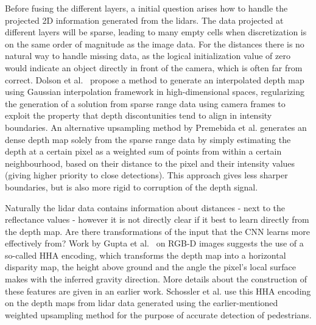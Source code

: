 Before fusing the different layers, a initial question arises how to handle the projected 2D information generated from the lidars. The data projected at different layers will be sparse, leading to many empty cells when discretization is on the same order of magnitude as the image data. For the distances there is no natural way to handle missing data, as the logical initialization value of zero would indicate an object directly in front of the camera, which is often far from correct. Dolson et al.~\cite{dolson2010} propose a method to generate an interpolated depth map using Gaussian interpolation framework in high-dimensional spaces, regularizing the generation of a solution from sparse range data using camera frames to exploit the property that depth discontunities tend to align in intensity boundaries. An alternative upsampling method by Premebida et al.\cite{premebida2014} generates an dense depth map solely from the sparse range data by simply estimating the depth at a certain pixel as a weighted sum of points from within a certain neighbourhood, based on their distance to the pixel and their intensity values (giving higher priority to close detections). This approach gives less sharper boundaries, but is also more rigid to corruption of the depth signal.  

Naturally the lidar data contains information about distances - next to the reflectance values - however it is not directly clear if it best to learn directly from the depth map. Are there transformations of the input that the CNN learns more effectively from? Work by Gupta et al.~\cite{gupta2014} on RGB-D images suggests the use of a so-called HHA encoding, which transforms the depth map into a horizontal disparity map, the height above ground and the angle the pixel's local surface makes with the inferred gravity direction. More details about the construction of these features are given in an earlier work\cite{gupta2013}. Schossler et al.\cite{schlosser2016} use this HHA encoding on the depth maps from lidar data generated using the earlier-mentioned weighted upsampling method\cite{premebida2014} for the purpose of accurate detection of pedestrians.
